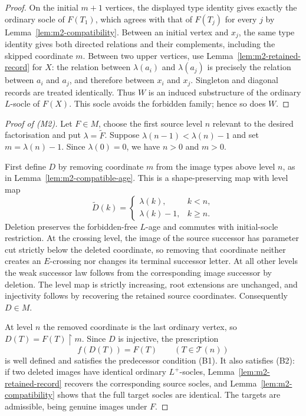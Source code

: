 \begin{proof}
On the initial $m+1$ vertices, the displayed type identity gives
exactly the ordinary socle of $F(T_1)$, which agrees with that of
$F(T_j)$ for every $j$ by Lemma~\ref{lem:m2-compatibility}.
Between an initial vertex and $x_j$, the same type identity gives
both directed relations and their complements, including the skipped
coordinate $m$.  Between two upper vertices, use
Lemma~\ref{lem:m2-retained-record} for $X$: the relation between
$\lambda(a_i)$ and $\lambda(a_j)$ is precisely the relation between
$a_i$ and $a_j$, and therefore between $x_i$ and $x_j$.  Singleton
and diagonal records are treated identically.  Thus $W$ is an
induced substructure of the ordinary $L$-socle of $F(X)$.  This
socle avoids the forbidden family; hence so does $W$.
\end{proof}

\begin{proof}[Proof of (M2)]
Let $F\in M$, choose the first source level $n$ relevant to the
desired factorisation and put $\lambda=\widetilde F$.  Suppose
$\lambda(n-1)<\lambda(n)-1$ and set $m=\lambda(n)-1$.
Since $\lambda(0)=0$, we have $n>0$ and $m>0$.

First define $D$ by removing coordinate $m$ from the image types
above level $n$, as in Lemma~\ref{lem:m2-compatible-age}.  This is a
shape-preserving map with level map
\[
 \widetilde D(k)=\begin{cases}
       \lambda(k),&k<n,\\
       \lambda(k)-1,&k\geq n.
       \end{cases}
\]
Deletion preserves the forbidden-free $L$-age and commutes with
initial-socle restriction.  At the crossing level, the image of the
source successor has parameter cut strictly below the deleted
coordinate, so removing that coordinate neither creates an
$E$-crossing nor changes its terminal successor letter.  At all
other levels the weak successor law follows from the corresponding
image successor by deletion.  The level map is strictly increasing,
root extensions are unchanged, and injectivity follows by recovering
the retained source coordinates.  Consequently $D\in M$.

At level $n$ the removed coordinate is the last ordinary vertex,
so $D(T)=F(T)\restriction m$.  Since $D$ is injective, the
prescription
\[
       f(D(T))=F(T)\qquad (T\in\mathcal T(n))
\]
is well defined and satisfies the predecessor condition (B1).
It also satisfies (B2): if two deleted images have identical ordinary
$L^+$-socles, Lemma~\ref{lem:m2-retained-record} recovers the
corresponding source socles, and
Lemma~\ref{lem:m2-compatibility} shows that the full target socles
are identical.  The targets are admissible, being genuine images
under $F$.


\end{proof}

